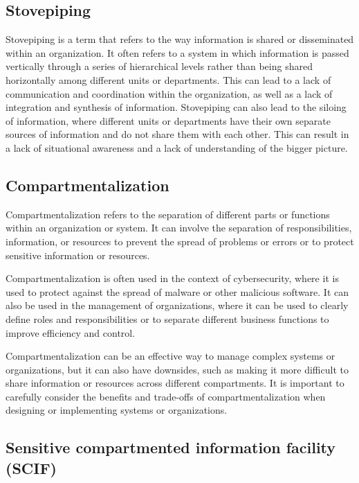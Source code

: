 \subsection{Stovepiping}

Stovepiping is a term that refers to the way information is shared or disseminated within an organization. It often refers to a system in which information is passed vertically through a series of hierarchical levels rather than being shared horizontally among different units or departments. This can lead to a lack of communication and coordination within the organization, as well as a lack of integration and synthesis of information. Stovepiping can also lead to the siloing of information, where different units or departments have their own separate sources of information and do not share them with each other. This can result in a lack of situational awareness and a lack of understanding of the bigger picture.



\subsection{Compartmentalization}

Compartmentalization refers to the separation of different parts or functions within an organization or system. It can involve the separation of responsibilities, information, or resources to prevent the spread of problems or errors or to protect sensitive information or resources.

Compartmentalization is often used in the context of cybersecurity, where it is used to protect against the spread of malware or other malicious software. It can also be used in the management of organizations, where it can be used to clearly define roles and responsibilities or to separate different business functions to improve efficiency and control.

Compartmentalization can be an effective way to manage complex systems or organizations, but it can also have downsides, such as making it more difficult to share information or resources across different compartments. It is important to carefully consider the benefits and trade-offs of compartmentalization when designing or implementing systems or organizations.


\subsection{Sensitive compartmented information facility (SCIF)}

